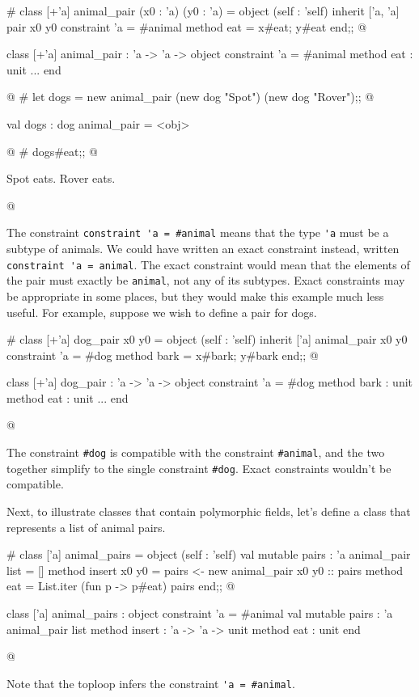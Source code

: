 \begin{ocaml}
# class [+'a] animal_pair (x0 : 'a) (y0 : 'a) =
    object (self : 'self)
      inherit ['a, 'a] pair x0 y0
      constraint 'a = #animal
      method eat = x#eat; y#eat
    end;;
@
\begin{topoutput}
class [+'a] animal_pair : 'a -> 'a ->
  object
    constraint 'a = #animal
    method eat : unit
    ...
  end
\end{topoutput}
@
# let dogs = new animal_pair (new dog "Spot") (new dog "Rover");;
@
\begin{topoutput}
val dogs : dog animal_pair = <obj>
\end{topoutput}
@
# dogs#eat;;
@
\begin{topoutput}
Spot eats.
Rover eats.
\end{topoutput}
@
\end{ocaml}
%
The constraint \hbox{\lstinline$constraint 'a = #animal$} means that the
type \hbox{\lstinline$'a$} must be a subtype of animals.  We could have
written an exact constraint instead, written
\hbox{\lstinline$constraint 'a = animal$}.
The exact constraint would mean that the elements of the pair must
exactly be \hbox{\lstinline$animal$}, not any of its subtypes.  Exact
constraints may be appropriate in some places, but they would make
this example much less useful.  For example, suppose we wish to define
a pair for dogs.

\begin{ocaml}
# class [+'a] dog_pair x0 y0 =
    object (self : 'self)
      inherit ['a] animal_pair x0 y0
      constraint 'a = #dog
      method bark = x#bark; y#bark
    end;;
@
\begin{topoutput}
class [+'a] dog_pair : 'a -> 'a ->
  object
    constraint 'a = #dog
    method bark : unit
    method eat : unit
    ...
  end
\end{topoutput}
@
\end{ocaml}
%
The constraint \hbox{\lstinline$#dog$} is compatible with the
constraint \hbox{\lstinline$#animal$}, and the two together simplify to the
single constraint \hbox{\lstinline$#dog$}.  Exact constraints wouldn't
be compatible.

Next, to illustrate classes that contain polymorphic fields, let's
define a class that represents a list of animal pairs.

\begin{ocaml}
# class ['a] animal_pairs =
  object (self : 'self)
    val mutable pairs : 'a animal_pair list = []
    method insert x0 y0 =
      pairs <- new animal_pair x0 y0 :: pairs
    method eat = List.iter (fun p -> p#eat) pairs
  end;;
@
\begin{topoutput}
class ['a] animal_pairs :
  object
    constraint 'a = #animal
    val mutable pairs : 'a animal_pair list
    method insert : 'a -> 'a -> unit
    method eat : unit
  end
\end{topoutput}
@
\end{ocaml}
%
Note that the toploop infers the constraint \hbox{\lstinline$'a = #animal$}.

